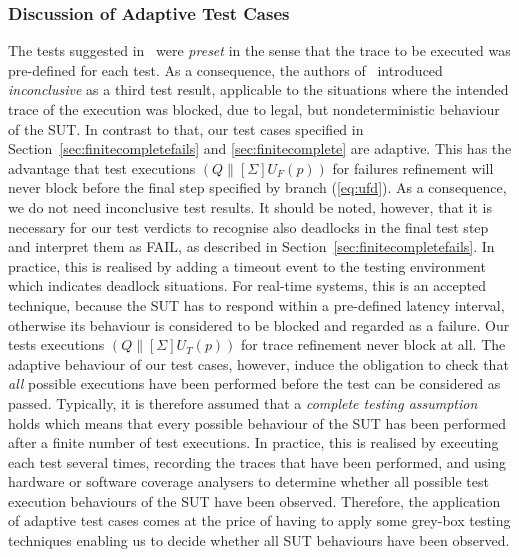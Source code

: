 \subsubsection*{Discussion of Adaptive Test Cases}
The tests suggested 
in~\cite{Hennessy:1988:ATP:50497,DBLP:conf/icfem/CavalcantiG07} were \emph{preset} in the
sense that the trace to be executed was pre-defined for each test. As a consequence,
the authors of~\cite{DBLP:conf/icfem/CavalcantiG07} introduced \emph{inconclusive}
as a third test result, applicable to the situations where the intended trace
of the execution was blocked, due to legal, but nondeterministic behaviour of the
SUT. In contrast to that, 
our test cases
specified in Section~\ref{sec:finitecompletefails} and \ref{sec:finitecomplete} are
adaptive. This has the advantage that test executions $(Q\parallel[\Sigma] U_F(p))$
for failures refinement
will never block before the final step specified by branch (\ref{eq:ufd}). As
a consequence, we do not need inconclusive test results. It should be noted, however,
that it is necessary for our test verdicts to recognise also deadlocks in the final
test step and interpret 
them as FAIL, as described in Section~\ref{sec:finitecompletefails}. In practice,
this is realised by adding a timeout event to the testing environment which indicates
deadlock situations. For real-time systems, this is an accepted technique, because
the SUT has to respond within a pre-defined latency interval, otherwise its behaviour 
is considered to be blocked and regarded as a failure. Our tests executions 
$(Q\parallel[\Sigma] U_T(p))$ for trace refinement never block at all. The adaptive       
behaviour of our test cases, however, induce the obligation to check that {\it all}
possible executions have been performed before the test can be considered as passed.
Typically, it is therefore assumed that a 
\emph{complete testing assumption}~\cite{hierons_testing_2004} holds which means that
every possible behaviour of the SUT has been performed after a finite number of
test executions. 
In practice, this is realised by executing each test several times, 
recording the traces that have been performed, and using hardware or software coverage 
analysers to determine whether all possible test execution behaviours of the SUT
have been observed. Therefore, the application of adaptive test cases comes at the price
of having to apply some grey-box testing techniques enabling us to decide whether
all SUT behaviours have been observed.


